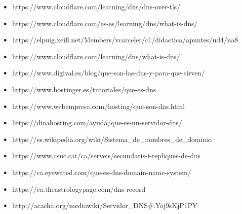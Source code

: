 \documentclass[]{article}
\providecommand{\tightlist}{%
  \setlength{\itemsep}{0pt}\setlength{\parskip}{0pt}}
\begin{document}
\begin{itemize}
\tightlist
\item
  https://www.cloudflare.com/learning/dns/dns-over-tls/
\item
  https://www.cloudflare.com/es-es/learning/dns/what-is-dns/
\item
  https://elpuig.xeill.net/Members/vcarceler/c1/didactica/apuntes/ud4/na8
\item
  https://www.cloudflare.com/learning/dns/what-is-dns/
\item
  https://www.digival.es/blog/que-son-las-dns-y-para-que-sirven/
\item
  https://www.hostinger.es/tutoriales/que-es-dns
\item
  https://www.webempresa.com/hosting/que-son-dns.html
\item
  https://dinahosting.com/ayuda/que-es-un-servidor-dns/
\item
  https://es.wikipedia.org/wiki/Sistema\_de\_nombres\_de\_dominio
\item
  https://www.csuc.cat/ca/serveis/secundaris-i-repliques-de-dns
\item
  https://ca.eyewated.com/que-es-dns-domain-name-system/
\item
  https://ca.theastrologypage.com/dns-record
\item
  http://acacha.org/mediawiki/Servidor\_DNS\#.Yoj9sKjP1PY
\end{itemize}
\end{document}

